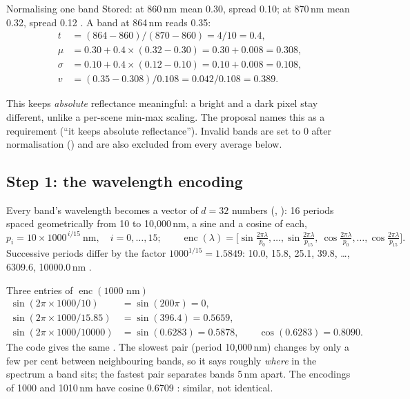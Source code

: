 \begin{worked}[label={we:namer:lerp}]{Normalising one band}
Stored: at 860\,nm mean 0.30, spread 0.10; at 870\,nm mean 0.32, spread 0.12 \tagA. A band at 864\,nm reads 0.35:
\begin{align*}
t &= (864-860)/(870-860) = 4/10 = 0.4,\\
\mu &= 0.30+0.4\times(0.32-0.30) = 0.30+0.008 = 0.308,\\
\sigma &= 0.10+0.4\times(0.12-0.10) = 0.10+0.008 = 0.108,\\
v &= (0.35-0.308)/0.108 = 0.042/0.108 = 0.389 .
\end{align*}
\end{worked}

This keeps \emph{absolute} reflectance meaningful: a bright and a dark pixel stay different, unlike a per-scene
min-max scaling. The proposal names this as a requirement (``it keeps absolute reflectance''). Invalid bands are set
to 0 after normalisation () and are also excluded from every average below.

\subsection{Step 1: the wavelength encoding}

Every band's wavelength becomes a vector of $d=32$ numbers (,
): 16 periods spaced geometrically from 10 to 10,000\,nm, a sine and a cosine of each,
\begin{equation}
p_i=10\times1000^{\,i/15}\ \text{nm},\quad i=0,\dots,15;\qquad
\operatorname{enc}(\lambda)=\Big[\sin\tfrac{2\pi\lambda}{p_0},\dots,\sin\tfrac{2\pi\lambda}{p_{15}},\
\cos\tfrac{2\pi\lambda}{p_0},\dots,\cos\tfrac{2\pi\lambda}{p_{15}}\Big].
\label{eq:namer:enc}
\end{equation}
Successive periods differ by the factor $1000^{1/15}=1.5849$: 10.0, 15.8, 25.1, 39.8, \dots, 6309.6, 10000.0\,nm \tagC.

\begin{worked}[label={we:namer:enc}]{Three entries of $\operatorname{enc}(1000\text{ nm})$}
\begin{align*}
\sin(2\pi\times1000/10) &= \sin(200\pi) = 0,\\
\sin(2\pi\times1000/15.85) &= \sin(396.4) = 0.5659,\\
\sin(2\pi\times1000/10000) &= \sin(0.6283) = 0.5878,\qquad \cos(0.6283)=0.8090 .
\end{align*}
The code gives the same \tagC. The slowest pair (period 10,000\,nm) changes by only a few per cent between
neighbouring bands, so it says roughly \emph{where} in the spectrum a band sits; the fastest pair separates bands 5\,nm
apart. The encodings of 1000 and 1010\,nm have cosine 0.6709 \tagC: similar, not identical.
\end{worked}


